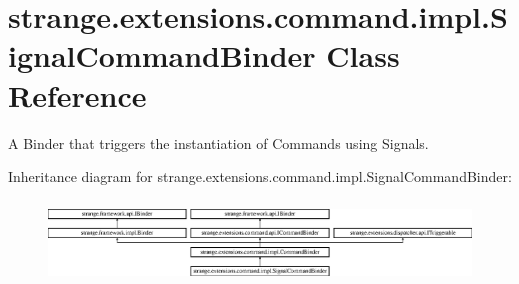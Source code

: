 \hypertarget{classstrange_1_1extensions_1_1command_1_1impl_1_1_signal_command_binder}{\section{strange.\-extensions.\-command.\-impl.\-Signal\-Command\-Binder Class Reference}
\label{classstrange_1_1extensions_1_1command_1_1impl_1_1_signal_command_binder}
}


A Binder that triggers the instantiation of Commands using Signals.  


Inheritance diagram for strange.\-extensions.\-command.\-impl.\-Signal\-Command\-Binder\-:\begin{figure}[H]
\begin{center}
\leavevmode
\includegraphics[height=2.202557cm]{classstrange_1_1extensions_1_1command_1_1impl_1_1_signal_command_binder}
\end{center}
\end{figure}
